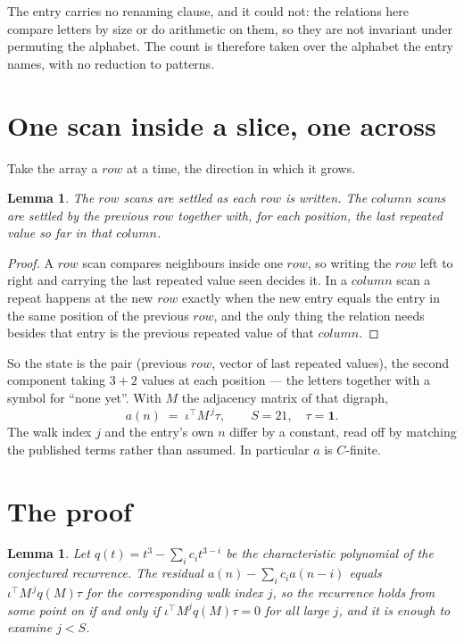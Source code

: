 \documentclass[11pt,a4paper]{article}
\theoremstyle{plain}
\newtheorem{lemma}[theorem]{Lemma}
\theoremstyle{definition}
\begin{document}
The entry carries no renaming clause, and it could not: the relations here compare letters by
size or do arithmetic on them, so they are not invariant under permuting the alphabet. The
count is therefore taken over the alphabet the entry names, with no reduction to patterns.

\section{One scan inside a slice, one across}

Take the array a $row$ at a time, the direction in which it grows.

\begin{lemma}\label{lem:state}
The $row$ scans are settled as each $row$ is written. The $column$ scans are
settled by the previous $row$ together with, for each position, the last repeated value
so far in that $column$.
\end{lemma}

\begin{proof}
A $row$ scan compares neighbours inside one $row$, so writing the
$row$ left to right and carrying the last repeated value seen decides it. In a
$column$ scan a repeat happens at the new $row$ exactly when the new entry equals the
entry in the same position of the previous $row$, and the only thing the relation needs
besides that entry is the previous repeated value of that $column$.
\end{proof}

So the state is the pair (previous $row$, vector of last repeated values), the second
component taking $3+2$ values at each position --- the letters together with a symbol for
``none yet''. With $M$ the adjacency matrix of that digraph,
\[
a(n)\;=\;\iota^{\!\top}M^{\,j}\tau ,\qquad S=21,\quad\tau=\mathbf{1} .
\]
The walk index $j$ and the entry's own $n$ differ by a constant, read off by matching the
published terms rather than assumed. In particular $a$ is $C$-finite.

\section{The proof}

\begin{lemma}\label{lem:crit}
Let $q(t)=t^{3}-\sum_i c_it^{3-i}$ be the characteristic polynomial of the
conjectured recurrence. The residual $a(n)-\sum_ic_ia(n-i)$ equals
$\iota^{\!\top}M^{\,j}q(M)\tau$ for the corresponding walk index $j$, so the recurrence
holds from some point on if and only if $\iota^{\!\top}M^{j}q(M)\tau=0$ for all large $j$,
and it is enough to examine $j<S$.
\end{lemma}
\end{document}
